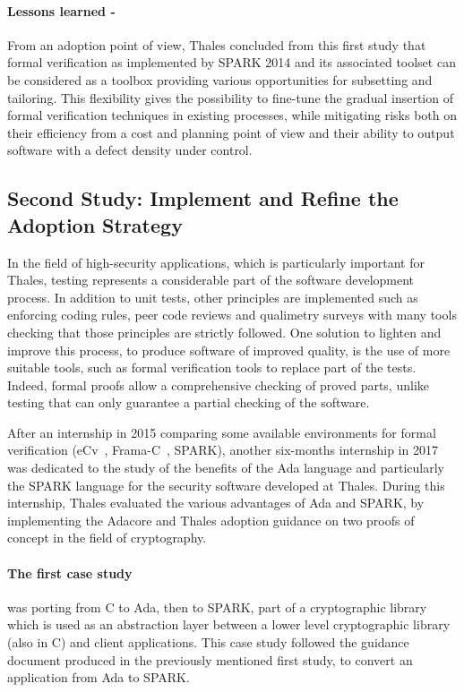 \documentclass{llncs}
\begin{document}
\paragraph{Lessons learned -}
From an adoption point of view, Thales concluded from this first study that
formal verification as implemented by SPARK 2014 and its associated toolset can
be considered as a toolbox providing various opportunities for subsetting and
tailoring. This flexibility gives the possibility to fine-tune the gradual
insertion of formal verification techniques in existing processes, while
mitigating risks both on their efficiency from a cost and planning point of
view and their ability to output software with a defect density under control.

\subsection{Second Study: Implement and Refine the Adoption Strategy}

In the field of high-security applications, which is particularly important for
Thales, testing represents a considerable part of the software development
process. In addition to unit tests, other principles are implemented such as
enforcing coding rules, peer code reviews and qualimetry surveys with many
tools checking that those principles are strictly followed. One solution to
lighten and improve this process, to produce software of improved quality, is
the use of more suitable tools, such as formal verification tools to replace
part of the tests. Indeed, formal proofs allow a comprehensive checking of
proved parts, unlike testing that can only guarantee a partial checking of the
software.

After an internship in 2015 comparing some available environments for formal
verification (eCv~\cite{Crocker2014CMS}, Frama-C~\cite{Kirchner2015}, SPARK),
another six-months internship in 2017 was dedicated to the study of the
benefits of the Ada language and particularly the SPARK language for the
security software developed at Thales. During this internship, Thales evaluated the various advantages of Ada and
SPARK, by implementing the Adacore and Thales adoption guidance on two proofs
of concept in the field of cryptography.

\paragraph{The first case study} was porting from C to Ada, then to SPARK, part of a
cryptographic library which is used as an abstraction layer between a lower
level cryptographic library (also in C) and client applications. This case study
followed the guidance document produced in the previously mentioned first
study, to convert an application from Ada to SPARK.
\end{document}
